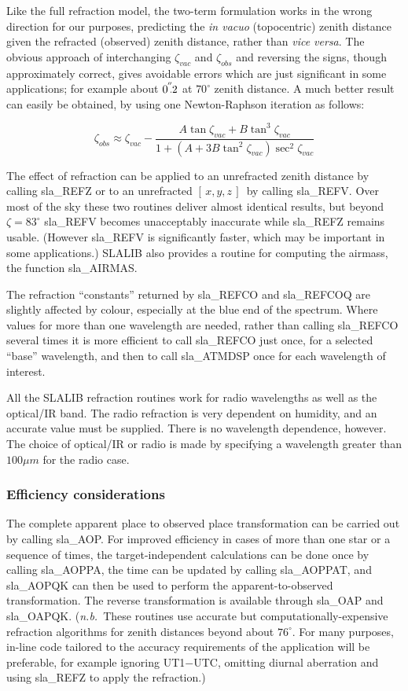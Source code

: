 \documentclass[11pt,twoside]{article}
\newcommand{\xyz}       {$[\,x,y,z\,]$}
\newcommand{\arcsec}[2] {\arcseci{#1}$\hspace{-0.4em}.#2$}
\newcommand{\arcsec}[2] {
      {$#1\hspace{-0.05em}^{'\hspace{-0.1em}'}\hspace{-0.4em}.#2$}
   }
\newcommand{\arcseci}[1] {$#1\hspace{-0.05em}$\raisebox{-0.5ex}
                         {$^{'\hspace{-0.1em}'}$}}
\renewcommand{\arcseci}[1] {$#1\hspace{-0.05em}^{'\hspace{-0.1em}'}$}
\begin{document}
Like the full refraction model, the two-term formulation works in the wrong
direction for our purposes, predicting
the {\it in vacuo}\/ (topocentric) zenith distance
given the refracted (observed) zenith distance,
rather than {\it vice versa}.  The obvious approach of
interchanging $\zeta _{vac}$ and $\zeta _{obs}$ and
reversing the signs, though approximately
correct, gives avoidable errors which are just significant in
some applications;  for
example about \arcsec{0}{2} at $70^\circ$ zenith distance.  A
much better result can easily be obtained, by using one Newton-Raphson
iteration as follows:

\[ \zeta _{obs} \approx \zeta _{vac}
    - \frac{A \tan \zeta _{vac} + B \tan ^{3}\zeta _{vac}}
    {1 + ( A + 3 B \tan ^{2}\zeta _{vac} ) \sec ^{2}\zeta _{vac}}\]

The effect of refraction can be applied to an unrefracted
zenith distance by calling
sla\_REFZ or to an unrefracted
\xyz\ by calling
sla\_REFV.
Over most of the sky these two routines deliver almost identical
results, but beyond $\zeta=83^\circ$
sla\_REFV
becomes unacceptably inaccurate while
sla\_REFZ
remains usable.  (However
sla\_REFV
is significantly faster, which may be important in some applications.)
SLALIB also provides a routine for computing the airmass, the function
sla\_AIRMAS.

The refraction ``constants'' returned by
sla\_REFCO and
sla\_REFCOQ
are slightly affected by colour, especially at the blue end
of the spectrum.  Where values for more than one
wavelength are needed, rather than calling
sla\_REFCO
several times it is more efficient to call
sla\_REFCO
just once, for a selected ``base'' wavelength, and then to call
sla\_ATMDSP
once for each wavelength of interest.

All the SLALIB refraction routines work for radio wavelengths as well
as the optical/IR band.  The radio refraction is very dependent on
humidity, and an accurate value must be supplied.  There is no
wavelength dependence, however.  The choice of optical/IR or
radio is made by specifying a wavelength greater than $100\mu m$
for the radio case.

\subsubsection{Efficiency considerations}
The complete apparent place to observed place transformation
can be carried out by calling
sla\_AOP.
For improved efficiency
in cases of more than one star or a sequence of times, the
target-independent calculations can be done once by
calling
sla\_AOPPA,
the time can be updated by calling
sla\_AOPPAT,
and
sla\_AOPQK
can then be used to perform the
apparent-to-observed transformation.  The reverse transformation
is available through
sla\_OAP
and
sla\_OAPQK.
({\it n.b.}\ These routines use accurate but computationally-expensive
refraction algorithms for zenith distances beyond about $76^\circ$.
For many purposes, in-line code tailored to the accuracy requirements
of the application will be preferable, for example ignoring UT1$-$UTC,
omitting diurnal aberration and using
sla\_REFZ
to apply the refraction.)
\end{document}

